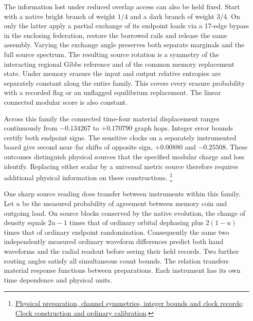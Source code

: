 \documentclass[11pt]{article}
\begin{document}
The information lost under reduced overlap access can also be held fixed.
Start with a native bright branch of weight $1/4$ and a dark branch of
weight $3/4$. On only the latter apply a partial exchange of its endpoint
loads via a 17-edge bypass in the enclosing federation, restore the
borrowed rails and release the same assembly. Varying the exchange angle
preserves both separate marginals and the full source spectrum. The
resulting source rotation is a symmetry of the interacting regional
Gibbs reference and of the common memory replacement state. Under
memory erasure the input and output relative entropies are separately
constant along the entire family. This covers every erasure probability
with a recorded flag or an unflagged equilibrium replacement.
The linear connected modular score is also constant.

Across this family the connected time-four material displacement ranges
continuously from $-0.134267$ to $+0.170790$ graph hops. Integer
error bounds certify both endpoint signs. The sensitive clocks on a
separately instrumented board give second near--far shifts of opposite
sign, $+0.00880$ and $-0.25508$. These outcomes distinguish physical
sources that the specified modular charge and loss identify. Replacing
either scalar by a universal metric source therefore requires additional
physical information on these constructions.%
\footnote{\href{https://github.com/FloatingPragma/observer-patch-holography/tree/main/model/experiments/interval_echo_shell_flux/product_address/green_response/material_recoil/overlap_source/native_boundary/regional_reference/recovery}{Physical preparation, channel symmetries, integer bounds and clock records};
\href{https://github.com/FloatingPragma/observer-patch-holography/tree/main/model/experiments/interval_echo_shell_flux/product_address/green_response/material_recoil/overlap_source/native_boundary/matched_probe/signal_time}{Clock construction and ordinary calibration}.}

One sharp source reading does transfer between instruments within this
family. Let $u$ be the measured probability of agreement between memory
coin and outgoing load. On source blocks conserved by the native
evolution, the change of density equals $2u-1$ times that of ordinary
orbital dephasing plus $2(1-u)$ times that of ordinary endpoint
randomization. Consequently the same two independently measured
ordinary waveform differences predict both hand waveforms and the
radial readout before seeing their held records. Two further routing
angles satisfy all simultaneous count bounds. The relation transfers
material response functions between preparations. Each instrument
has its own time dependence and physical units.
\end{document}
